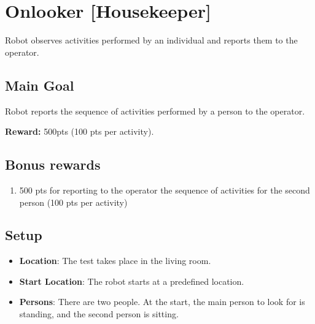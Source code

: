 \section{Onlooker [Housekeeper]}
Robot observes activities performed by an individual and reports them to the operator. 

\subsection{Main Goal}
Robot reports the sequence of activities performed by a person to the operator.

\noindent\textbf{Reward:} 500pts (100 pts per activity).

\subsection{Bonus rewards}
\begin{enumerate}[nosep]
	\item 500 pts for reporting to the operator the sequence of activities for the second person (100 pts per activity)
\end{enumerate}


\subsection{Setup}
\begin{itemize}
	\item \textbf{Location}: The test takes place in the living room.

	\item \textbf{Start Location}: The robot starts at a predefined location.

	\item \textbf{Persons}: There are two people. At the start, the main person to look for is standing, and the second person is sitting.
\end{itemize}

